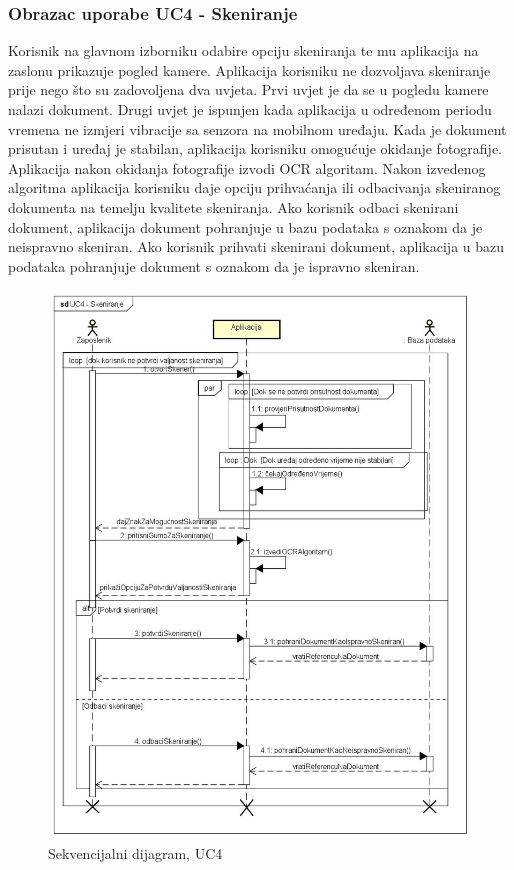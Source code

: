 				\subsubsection{Obrazac uporabe UC4 - Skeniranje}
				Korisnik na glavnom izborniku odabire opciju skeniranja te mu aplikacija na zaslonu prikazuje pogled kamere. Aplikacija korisniku ne dozvoljava skeniranje prije nego što su zadovoljena dva uvjeta. Prvi uvjet je da se u pogledu kamere nalazi dokument. Drugi uvjet je ispunjen kada aplikacija u određenom periodu vremena ne izmjeri vibracije sa senzora na mobilnom uređaju. Kada je dokument prisutan i uređaj je stabilan, aplikacija korisniku omogućuje okidanje fotografije. Aplikacija nakon okidanja fotografije izvodi OCR algoritam. Nakon izvedenog algoritma aplikacija korisniku daje opciju prihvaćanja ili odbacivanja skeniranog dokumenta na temelju kvalitete skeniranja. Ako korisnik odbaci skenirani dokument, aplikacija dokument pohranjuje u bazu podataka s oznakom da je neispravno skeniran. Ako korisnik prihvati skenirani dokument, aplikacija u bazu podataka pohranjuje dokument s oznakom da je ispravno skeniran.
				\begin{figure}[H]
					\includegraphics[scale=0.35]{slike/UC4 - Skeniranje} %
					\centering
					\caption{ Sekvencijalni dijagram, UC4}
					\label{fig:promjene}
				\end{figure}


